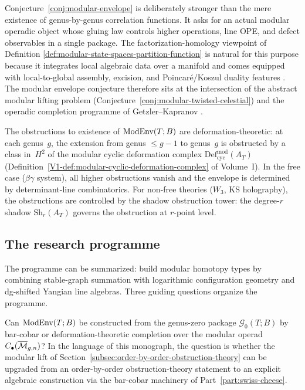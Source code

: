 \begin{remark}
Conjecture~\ref{conj:modular-envelope} is deliberately stronger than the mere existence of
genus-by-genus correlation functions. It asks for an actual modular operadic object whose
gluing law controls higher operations, line OPE, and defect observables in a single package.
The factorization-homology viewpoint of Definition
\ref{def:modular-state-spaces-partition-function} is natural for this purpose because it
integrates local algebraic data over a manifold and comes equipped with local-to-global
assembly, excision, and Poincar\'e/Koszul duality features \cite{AF15}. The modular envelope
conjecture therefore sits at the intersection of the abstract modular lifting problem
(Conjecture~\ref{conj:modular-twisted-celestial}) and the operadic completion programme of
Getzler--Kapranov \cite{GeK98}.

The obstructions to existence of $\operatorname{ModEnv}(T;B)$ are deformation-theoretic: at each genus~$g$,
the extension from genus $\leq g-1$ to genus~$g$ is obstructed by a class in~$H^2$ of the
modular cyclic deformation complex $\mathrm{Def}_{\mathrm{cyc}}^{\mathrm{mod}}(A_T)$
(Definition~\ref*{V1-def:modular-cyclic-deformation-complex} of Volume~I). In the free case
($\beta\gamma$ system), all higher obstructions vanish and the envelope is determined by
determinant-line combinatorics. For non-free theories ($W_3$, KS holography), the obstructions
are controlled by the shadow obstruction tower: the degree-$r$ shadow
$\mathrm{Sh}_r(A_T)$ governs the obstruction at $r$-point level.
\end{remark}

\subsection{The research programme}

The programme can be summarized: build modular homotopy types by
combining stable-graph summation with logarithmic configuration geometry
and dg-shifted Yangian line algebras. Three guiding questions organize
the programme.

\begin{problem}[Existence]
Can $\operatorname{ModEnv}(T;B)$ be constructed from the genus-zero package $\mathcal G_0(T;B)$ by
bar-cobar or deformation-theoretic completion over the modular operad
$C_\bullet(\overline{\mathcal M}_{g,n})$? In the language of this monograph, the question is whether the
modular lift of Section~\ref{subsec:order-by-order-obstruction-theory} can be upgraded from
an order-by-order obstruction-theory statement to an explicit algebraic construction via
the bar-cobar machinery of Part~\ref{part:swiss-cheese}.
\end{problem}

